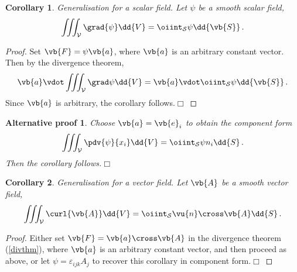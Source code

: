 \documentclass{article}
\theoremstyle{plain}\theoremheaderfont{\normalfont\itshape}\theorembodyfont{\rmfamily}\theoremseparator{.}\newtheorem*{rem}{Remark}\newtheorem*{ex}{Example}\newtheorem*{proof}{Proof}\newtheorem*{altp}{Alternative proof}
\theoremstyle{plain}\theoremheaderfont{\normalfont\bfseries}\theorembodyfont{\rmfamily}\theoremseparator{.}\newtheorem{thm}{Theorem}[section]\newtheorem{lem}[thm]{Lemma}\newtheorem{prop}[thm]{Proposition}\newtheorem*{cor}{Corollary}\newtheorem{defn}[thm]{Definition}\newtheorem{clm}[thm]{Claim}\newtheorem{clminproof}{Claim}
\theoremstyle{break}\theoremheaderfont{\normalfont\itshape}\theorembodyfont{\rmfamily}\theoremseparator{.\medskip}\newtheorem*{proofskip}{Proof}\newtheorem*{exs}{Examples}\newtheorem*{rems}{Remarks}
\theoremstyle{break}\theoremheaderfont{\normalfont\bfseries}\theorembodyfont{\rmfamily}\theoremseparator{.\medskip}\newtheorem{lemskip}[thm]{Lemma}\newtheorem{defnskip}[thm]{Definition}\newtheorem{propskip}[thm]{Proposition}\newtheorem{thmskip}[thm]{Theorem}
\numberwithin{equation}{section}
\newcommand{\qed}{\hfill\ensuremath{\Box}}
\begin{document}
	\begin{cor}
		Generalisation for a scalar field. Let \(\psi\) be a smooth scalar field,
		\[\iiint_{\mathcal{V}}\grad{\psi}\dd{V}=\oiint_{\mathcal{S}}\psi\dd{\vb{S}}\,.\]
	\end{cor}
	\begin{proof}
		Set \(\vb{F}=\psi\vb{a}\), where \(\vb{a}\) is an arbitrary constant vector. Then by the divergence theorem,
		\[\vb{a}\vdot\iiint_\mathcal{V}\grad\psi\dd{V}=\vb{a}\vdot\oiint_\mathcal{S}\psi\dd{\vb{S}}\,.\]
		Since \(\vb{a}\) is arbitrary, the corollary follows.\qed
	\end{proof}
	\begin{altp}
		Choose \(\vb{a}=\vb{e}_i\) to obtain the component form
		\[\iiint_\mathcal{V}\pdv{\psi}{x_i}\dd{V}=\oiint_\mathcal{S}\psi n_i\dd{S}\,.\]
		Then the corollary follows.\qed
	\end{altp}
	\begin{cor}
		Generalisation for a vector field. Let \(\vb{A}\) be a smooth vector field,
		\[\iiint_{\mathcal{V}}\curl{\vb{A}}\dd{V}=\oiint_{\mathcal{S}}\vu{n}\cross\vb{A}\dd{S}\,.\]
	\end{cor}
	\begin{proof}
		Either set \(\vb{F}=\vb{a}\cross\vb{A}\) in the divergence theorem (\cref{divthm}), where \(\vb{a}\) is an arbitrary constant vector, and then proceed as above, or let \(\psi=\varepsilon_{ijk}A_j\) to recover this corollary in component form.\qed
	\end{proof}
	
\end{document}
